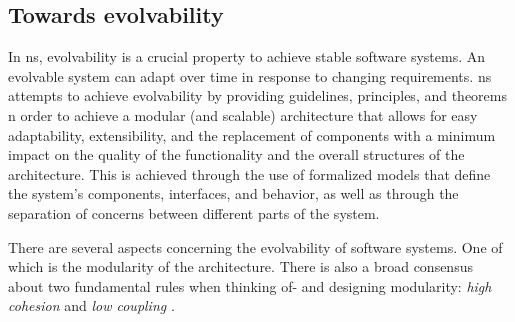 \subsection{Towards evolvability} \label{sec:on_evolvability}

In \gls{ns}, evolvability is a crucial property to achieve stable software
systems. An evolvable system can adapt over time in response to changing requirements.
\gls{ns} attempts to achieve evolvability by providing guidelines, principles, and theorems
n order to achieve a modular (and scalable) architecture that allows for easy
adaptability, extensibility, and the replacement of components with a minimum impact on the
quality of the functionality and the overall structures of the architecture. This is
achieved through the use of formalized models that define the system's components,
interfaces, and behavior, as well as through the separation of concerns between different
parts of the system.

There are several aspects concerning the evolvability of software systems. One of which is
the modularity of the architecture. There is also a broad consensus about two fundamental
rules when thinking of- and designing modularity: \emph{high cohesion} and \emph{low
coupling} \autocite[22]{mannaert_normalized_2016}.
